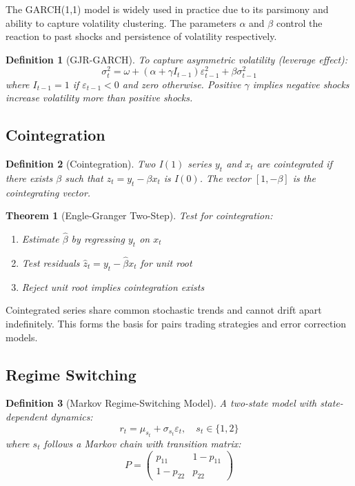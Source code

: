 \documentclass[a4paper, 11pt]{article}
\newtheorem{definition}{Definition}[section]
\newtheorem{theorem}{Theorem}[section]
\begin{document}
The GARCH(1,1) model is widely used in practice due to its parsimony and ability to capture
volatility clustering. The parameters $\alpha$ and $\beta$ control the reaction to past
shocks and persistence of volatility respectively.

\begin{definition}[GJR-GARCH]
To capture asymmetric volatility (leverage effect):
\begin{equation}
\sigma_t^2 = \omega + (\alpha + \gamma I_{t-1})\varepsilon_{t-1}^2 + \beta \sigma_{t-1}^2
\end{equation}
where $I_{t-1} = 1$ if $\varepsilon_{t-1} < 0$ and zero otherwise. Positive $\gamma$
implies negative shocks increase volatility more than positive shocks.
\end{definition}

\subsection{Cointegration}

\begin{definition}[Cointegration]
Two I$(1)$ series $y_t$ and $x_t$ are cointegrated if there exists $\beta$ such that
$z_t = y_t - \beta x_t$ is I$(0)$. The vector $[1, -\beta]$ is the cointegrating vector.
\end{definition}

\begin{theorem}[Engle-Granger Two-Step]
Test for cointegration:
\begin{enumerate}
\item Estimate $\hat{\beta}$ by regressing $y_t$ on $x_t$
\item Test residuals $\hat{z}_t = y_t - \hat{\beta}x_t$ for unit root
\item Reject unit root implies cointegration exists
\end{enumerate}
\end{theorem}

Cointegrated series share common stochastic trends and cannot drift apart indefinitely. This
forms the basis for pairs trading strategies and error correction models.

\subsection{Regime Switching}

\begin{definition}[Markov Regime-Switching Model]
A two-state model with state-dependent dynamics:
\begin{equation}
r_t = \mu_{s_t} + \sigma_{s_t} \varepsilon_t, \quad s_t \in \{1, 2\}
\end{equation}
where $s_t$ follows a Markov chain with transition matrix:
\begin{equation}
P = \begin{pmatrix} p_{11} & 1-p_{11} \\ 1-p_{22} & p_{22} \end{pmatrix}
\end{equation}
\end{definition}
\end{document}
